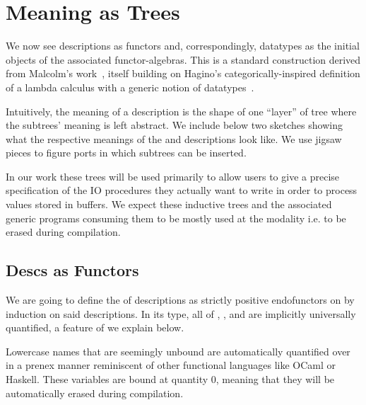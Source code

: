 \section{Meaning as Trees}\label{sec:trees}

We now see descriptions as functors and, correspondingly,
datatypes as the initial objects of the associated functor-algebras.
%
This is a standard construction derived from Malcolm's
work~\citeyearpar{DBLP:journals/scp/Malcolm90},
itself building on Hagino's categorically-inspired
definition of a lambda calculus
with a generic notion of datatypes~\citep{DBLP:conf/ctcs/Hagino87}.

Intuitively, the meaning of a description is the shape of one ``layer'' of
tree where the subtrees' meaning is left abstract. We include below two
sketches showing what the respective meanings of the 
and  descriptions look like.
%
We use jigsaw pieces to figure ports in which subtrees can be inserted.

\noindent
\begin{center}
\scalebox{.8}{}
\end{center}

In our work these trees will be used primarily to allow users to
give a precise specification of the IO procedures they actually want
to write in order to process values stored in buffers.
%
We expect these inductive trees and the associated generic programs
consuming them to be mostly used at the 
modality i.e. to be erased during compilation.

\subsection{Descs as Functors}

We are going to define the  of descriptions
as strictly positive endofunctors on  by
induction on said descriptions.
%
In its type, all of , ,
and  are implicitly universally quantified,
a feature of \idris{} we explain below.


\begin{remark}\label{rmk:prenexpoly}
  Lowercase names that are seemingly unbound are automatically
  quantified over in a prenex manner reminiscent of other functional
  languages like OCaml or Haskell.
  These variables are bound at quantity 0, meaning that they will
  be automatically erased during compilation.
\end{remark}

